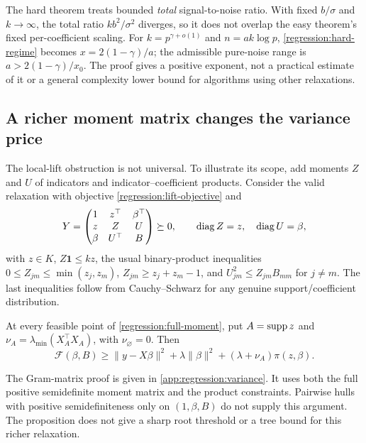 The hard theorem treats bounded \emph{total} signal-to-noise ratio.
With fixed $b/\sigma$ and $k\to\infty$, the total ratio
$kb^2/\sigma^2$ diverges, so it does not overlap the easy theorem's
fixed per-coefficient scaling. For $k=p^{\gamma+o(1)}$ and
$n=a k\log p$, \eqref{regression:hard-regime} becomes
$x=2(1-\gamma)/a$; the admissible pure-noise range is
$a>2(1-\gamma)/x_0$. The proof gives a positive exponent, not a
practical estimate of it or a general complexity lower bound for
algorithms using other relaxations.

\subsection{A richer moment matrix changes the variance price}
\label{regression:richer}

The local-lift obstruction is not universal. To illustrate its scope,
add moments $Z$ and $U$ of indicators and indicator--coefficient products.
Consider the valid relaxation with objective
\eqref{regression:lift-objective} and
\begin{equation}\label{regression:full-moment}
 Y=\begin{pmatrix}1&z^\top&\beta^\top\\
 z&Z&U\\\beta&U^\top&B\end{pmatrix}\succeq0,\qquad
 \operatorname{diag} Z=z,\quad\operatorname{diag} U=\beta,
\end{equation}
with $z\in K$, $Z\mathbf1\leq kz$, the usual binary-product inequalities
$0\leq Z_{jm}\leq\min(z_j,z_m)$,
$Z_{jm}\geq z_j+z_m-1$, and
$U_{jm}^2\leq Z_{jm}B_{mm}$ for $j\ne m$.
The last inequalities follow from Cauchy--Schwarz for any genuine
support/coefficient distribution.

\begin{proposition}
\label{regression:variance-price}
At every feasible point of \eqref{regression:full-moment}, put
$A=\operatorname{supp} z$ and $\nu_A=\lambda_{\min}(X_A^\top X_A)$, with
$\nu_\varnothing=0$. Then
\begin{equation}\label{regression:variance-price-eq}
 \mathcal F(\beta,B)\geq\|y-X\beta\|^2+\lambda\|\beta\|^2
                           +(\lambda+\nu_A)\pi(z,\beta).
\end{equation}
\end{proposition}
The Gram-matrix proof is given in \cref{app:regression:variance}.
It uses both the full positive semidefinite moment matrix and the
product constraints. Pairwise hulls with positive semidefiniteness
only on $(1,\beta,B)$ do not supply this argument. The proposition
does not give a sharp root threshold or a tree bound for this richer
relaxation.

